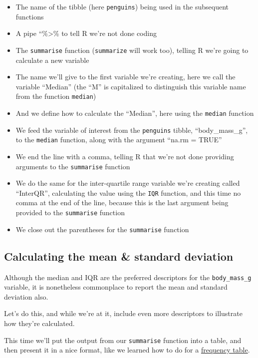 \documentclass[
]{book}
\providecommand{\tightlist}{%
  \setlength{\itemsep}{0pt}\setlength{\parskip}{0pt}}
\begin{document}
\begin{itemize}
\tightlist
\item
  The name of the tibble (here \texttt{penguins}) being used in the subsequent functions
\item
  A pipe ``\%\textgreater\% to tell R we're not done coding
\item
  The \texttt{summarise} function (\texttt{summarize} will work too), telling R we're going to calculate a new variable
\item
  The name we'll give to the first variable we're creating, here we call the variable ``Median'' (the ``M'' is capitalized to distinguish this variable name from the function \texttt{median})
\item
  And we define how to calculate the ``Median'', here using the \texttt{median} function
\item
  We feed the variable of interest from the \texttt{penguins} tibble, ``body\_mass\_g'', to the \texttt{median} function, along with the argument ``na.rm = TRUE''
\item
  We end the line with a comma, telling R that we're not done providing arguments to the \texttt{summarise} function
\item
  We do the same for the inter-quartile range variable we're creating called ``InterQR'', calculating the value using the \texttt{IQR} function, and this time no comma at the end of the line, because this is the last argument being provided to the \texttt{summarise} function
\item
  We close out the parentheses for the \texttt{summarise} function
\end{itemize}

\subsection{Calculating the mean \& standard deviation}\label{mean_sd}

Although the median and IQR are the preferred descriptors for the \texttt{body\_mass\_g} variable, it is nonetheless commonplace to report the mean and standard deviation also.

Let's do this, and while we're at it, include even more descriptors to illustrate how they're calculated.

This time we'll put the output from our \texttt{summarise} function into a table, and then present it in a nice format, like we learned how to do for a \hyperref[vis_cat_freq_table]{frequency table}.
\end{document}
